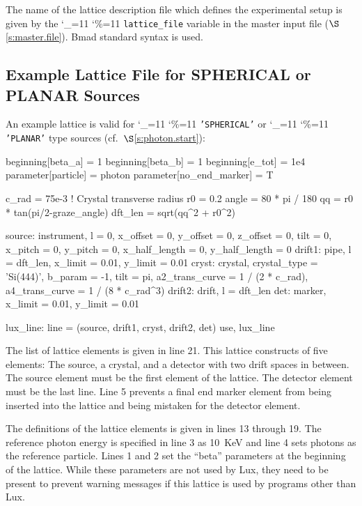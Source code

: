 \documentclass[11pt]{article}
\newcommand{\lux}{Lux\xspace}
\newcommand\ttcmd{\begingroup\catcode`\_=11 \catcode`\%=11 \dottcmd}
\newcommand\dottcmd[1]{\texttt{#1}\endgroup}
\newcommand{\vn}{\ttcmd}
\newcommand{\sref}[1]{$\S$\ref{#1}}
\begin{document}
The name of the lattice description file which defines the
experimental setup is given by the \vn{lattice_file} variable in the
master input file (\sref{s:master.file}). Bmad standard syntax is
used\cite{b:bmad}. 

\subsection{Example Lattice File for SPHERICAL or PLANAR Sources}
\label{s:spherical.lat}

An example lattice is valid for \vn{'SPHERICAL'} or
\vn{'PLANAR'} type sources (cf.~\sref{s:photon.start}):
\begin{listing}{1}
beginning[beta_a] = 1
beginning[beta_b] = 1
beginning[e_tot] = 1e4
parameter[particle] = photon
parameter[no_end_marker] = T

c_rad = 75e-3  ! Crystal transverse radius 
r0 = 0.2
angle  = 80 * pi / 180
qq = r0 * tan(pi/2-graze_angle)
dft_len = sqrt(qq^2 + r0^2)

source: instrument, l = 0, x_offset = 0, y_offset = 0, z_offset = 0, tilt = 0,
        x_pitch = 0, y_pitch = 0, x_half_length = 0, y_half_length = 0
drift1: pipe, l = dft_len, x_limit = 0.01, y_limit = 0.01
cryst: crystal, crystal_type = 'Si(444)', b_param = -1, tilt = pi, 
        a2_trans_curve = 1 / (2 * c_rad), a4_trans_curve = 1 / (8 * c_rad^3)
drift2: drift, l = dft_len
det: marker, x_limit = 0.01, y_limit = 0.01

lux_line: line = (source, drift1, cryst, drift2, det)
use, lux_line
\end{listing}

The list of lattice elements is given in line 21.  This lattice
constructs of five elements: The source, a crystal, and a detector
with two drift spaces in between. The source element must be the first
element of the lattice. The detector element must be the last
line. Line 5 prevents a final end marker element from being inserted
into the lattice and being mistaken for the detector element.

The definitions of the lattice elements is given in lines 13 through
19.  The reference photon energy is specified in line 3 as 10~KeV and
line 4 sets photons as the reference particle. Lines 1 and 2 set the
``beta'' parameters at the beginning of the lattice. While these
parameters are not used by \lux, they need to be present to prevent
warning messages if this lattice is used by programs other than \lux.
\end{document}
